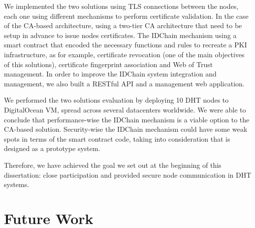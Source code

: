 We implemented the two solutions using TLS connections between the nodes, each one using different mechanisms to perform certificate validation.
In the case of the CA-based architecture, using a two-tier CA architecture that need to be setup in advance to issue nodes certificates.
The IDChain mechanism using a smart contract that encoded the necessary functions and rules to recreate a \ac{PKI} infrastructure, as for example, certificate revocation (one of the main objectives of this solutions), certificate fingerprint association and Web of Trust management.
In order to improve the IDChain system integration and management, we also built a RESTful API and a management web application.

We performed the two solutions evaluation by deploying 10 DHT nodes to DigitalOcean \ac{VM}, spread across several datacenters worldwide.
We were able to conclude that performance-wise the IDChain mechanism is a viable option to the CA-based solution.
Security-wise the IDChain mechanism could have some weak spots in terms of the smart contract code, taking into consideration that is designed as a prototype system.

Therefore, we have achieved the goal we set out at the beginning of this dissertation: close participation and provided secure node communication in DHT systems.

\section{Future Work}
\label{section:future}

\cleardoublepage

